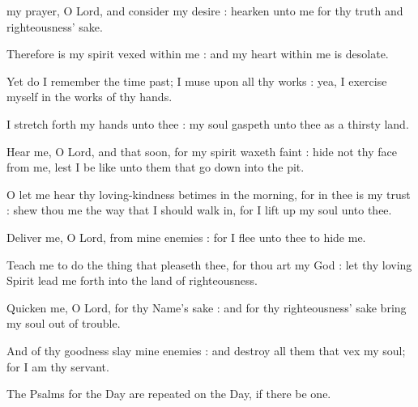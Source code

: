 
 my prayer, O Lord, and consider my desire : hearken unto me for thy truth and righteousness' sake.\par
{}
Therefore is my spirit vexed within me : and my heart within me is desolate.\par
{}Yet do I remember the time past; I muse upon all thy works : yea, I exercise myself in the works of thy hands.\par
{}I stretch forth my hands unto thee : my soul gaspeth unto thee as a thirsty land.\par
{}Hear me, O Lord, and that soon, for my spirit waxeth faint : hide not thy face from me, lest I be like unto them that go down into the pit.\par
{}O let me hear thy loving-kindness betimes in the morning, for in thee is my trust : shew thou me the way that I should walk in, for I lift up my soul unto thee.\par
{}Deliver me, O Lord, from mine enemies : for I flee unto thee to hide me.\par
{}Teach me to do the thing that pleaseth thee, for thou art my God : let thy loving Spirit lead me forth into the land of righteousness.\par
{}Quicken me, O Lord, for thy Name's sake : and for thy righteousness' sake bring my soul out of trouble.\par
{}And of thy goodness slay mine enemies : and destroy all them that vex my soul; for I am thy servant.\par

\begin{rubric}
    The Psalms for the  Day are repeated on the  Day, if there be one.
\end{rubric}

